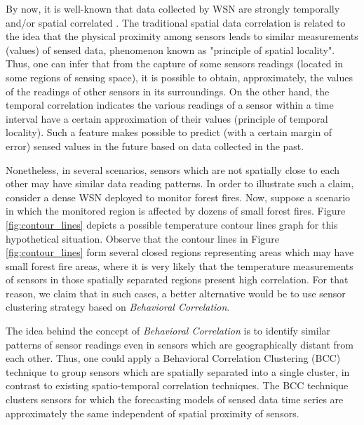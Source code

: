 \documentclass{acm_proc_article-sp}
\begin{document}
By now, it is well-known that data collected by WSN are strongly temporally
and/or spatial correlated \cite{Yoon2005, Chu2006}. The traditional spatial data
correlation is related to the idea that the physical proximity among sensors
leads to similar measurements (values) of sensed data, phenomenon known as
"principle of spatial locality". Thus, one can infer that from the capture of
some sensors readings (located in some regions of sensing space), it is possible
to obtain, approximately, the values of the readings of other sensors in its
surroundings. On the other hand, the temporal correlation indicates the various
readings of a sensor within a time interval have a certain approximation of
their values (principle of temporal locality). Such a feature makes possible to
predict (with a certain margin of error) sensed values in the future based on
data collected in the past.


Nonetheless, in several scenarios, sensors which are not spatially close to each
other may have similar data reading patterns. In order to illustrate such a
claim, consider a dense WSN deployed to monitor forest fires. 
Now, suppose a scenario in which the monitored region is affected by dozens of
small forest fires. Figure \ref{fig:contour_lines} depicts a possible temperature
contour lines graph for this hypothetical situation. Observe that the contour
lines in Figure \ref{fig:contour_lines} form several closed regions representing
areas which may have small forest fire areas, where it is very likely that the
temperature measurements of sensors in those spatially separated regions present
high correlation. For that reason, we claim that in such cases, a better
alternative would be to use sensor clustering strategy based on
\textit{Behavioral Correlation}.

The idea behind the concept of {\it Behavioral Correlation} is to identify
similar patterns of sensor readings even in sensors which are geographically
distant from each other. Thus, one could apply a Behavioral Correlation
Clustering (BCC) technique to group sensors which are spatially separated into a
single cluster, in contrast to existing spatio-temporal correlation techniques.
The BCC technique clusters sensors for which the forecasting models of sensed
data time series are approximately the same independent of spatial proximity of
sensors.
\end{document}
